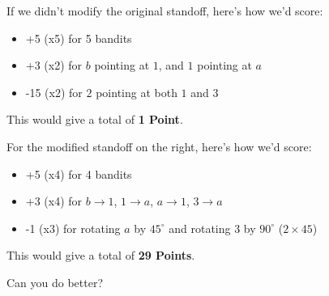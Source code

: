 \begin{figure}[h]
\begin{tikzpicture}
    \end{tikzpicture}
\end{figure}

If we didn't modify the original standoff, here's how we'd score:
\begin{itemize}
    \item +5 (x5) for 5 bandits
    \item +3 (x2) for $b$ pointing at $1$, and $1$ pointing at $a$
    \item -15 (x2) for $2$ pointing at both $1$ and $3$
\end{itemize}
This would give a total of \textbf{1 Point}.

For the modified standoff on the right, here's how we'd score:
\begin{itemize}
    \item +5 (x4) for 4 bandits
    \item +3 (x4) for $b \rightarrow 1$, $1 \rightarrow a$, $a \rightarrow 1$, $3 \rightarrow a$
    \item -1 (x3) for rotating $a$ by $45^\circ$ and rotating $3$ by $90^\circ$  ($2 \times 45$)
\end{itemize}
This would give a total of \textbf{29 Points}.

Can you do better?